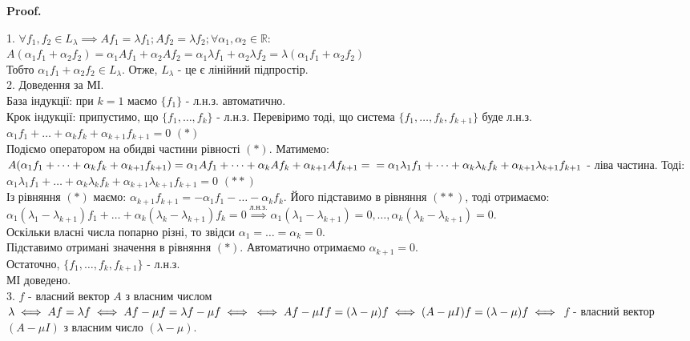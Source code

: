 \documentclass[a4paper, 10pt]{article}
\makeatletter
\def\qed{$\blacksquare$}
\theoremstyle{theoremdd}
\theoremstyle{theoremdd}
\theoremstyle{theoremdd}
\theoremstyle{theoremdd}
\theoremstyle{theoremdd}
\theoremstyle{theoremdd}
\theoremstyle{theoremdd}
\theoremstyle{theoremdd}
\renewenvironment{proof}[1][Proof.\\]{\par
\pushQED{\hfill \qed}%
\normalfont \topsep6\p@\@plus6\p@\relax
\trivlist
\item\relax
{\bfseries
#1\@addpunct{.}}\hspace\labelsep\ignorespaces
}{%
\popQED\endtrivlist\@endpefalse
}
\makeatother
\begin{document}
\begin{proof}
1. $\forall f_1,f_2 \in L_{\lambda} \implies Af_1 = \lambda f_1; Af_2 = \lambda f_2; \forall \alpha_1, \alpha_2 \in \mathbb{R}:$\\
$A(\alpha_1 f_1 + \alpha_2 f_2) = \alpha_1 Af_1 + \alpha_2 Af_2 = \alpha_1 \lambda f_1 + \alpha_2 \lambda f_2 = \lambda (\alpha_1 f_1 + \alpha_2 f_2)$\\
Тобто $\alpha_1 f_1 + \alpha_2 f_2 \in L_{\lambda}$. Отже, $L_\lambda$ - це є лінійний підпростір.
\bigskip \\
2. Доведення за МІ.\\
База індукції: при $k=1$ маємо $\{f_1\}$ - л.н.з. автоматично.\\
Крок індукції: припустимо, що $\{f_1,\dots,f_k\}$ - л.н.з. Перевіримо тоді, що система $\{f_1,\dots,f_k, f_{k+1}\}$ буде л.н.з.\\
$\alpha_1 f_1 + \dots + \alpha_k f_k + \alpha_{k+1} f_{k+1} = 0$ $(*)$\\
Подіємо оператором на обидві частини рівності $(*)$. Матимемо:\\
$A(\alpha_1 f_1 + \dots + \alpha_k f_k + \alpha_{k+1} f_{k+1}) = \alpha_1 Af_1 + \dots + \alpha_k Af_k + \alpha_{k+1} Af_{k+1} = \\ = \alpha_1 \lambda_1 f_1 + \dots + \alpha_k \lambda_k f_k + \alpha_{k+1} \lambda_{k+1} f_{k+1}$ - ліва частина. Тоді:\\
$\alpha_1 \lambda_1 f_1 + \dots + \alpha_k \lambda_k f_k + \alpha_{k+1} \lambda_{k+1} f_{k+1} = 0$ $(**)$\\
Із рівняння $(*)$ маємо: $\alpha_{k+1}f_{k+1} = -\alpha_1 f_1 - \dots - \alpha_k f_k$. Його підставимо в рівняння $(**)$, тоді отримаємо:\\
$\alpha_1 (\lambda_1 - \lambda_{k+1})f_1 + \dots + \alpha_k (\lambda_k - \lambda_{k+1})f_k = 0 \overset{\textrm{л.н.з.}}{\implies} \alpha_1(\lambda_1 - \lambda_{k+1})=0, \dots, \alpha_k(\lambda_k - \lambda_{k+1}) = 0$.\\
Оскільки власні числа попарно різні, то звідси $\alpha_1 = \dots = \alpha_k = 0$.\\
Підставимо отримані значення в рівняння $(*)$. Автоматично отримаємо $\alpha_{k+1} = 0$.\\
Остаточно, $\{f_1,\dots,f_k, f_{k+1}\}$ - л.н.з.\\
МІ доведено.
\bigskip \\
3. $f$ - власний вектор $A$ з власним числом $\lambda \iff Af = \lambda f \iff Af - \mu f = \lambda f - \mu f \iff \\ \iff Af - \mu If = (\lambda - \mu)f \iff (A-\mu I)f = (\lambda - \mu)f \iff$ $f$ - власний вектор $(A- \mu I)$ з власним число $(\lambda - \mu)$.

\end{proof}
\end{document}
